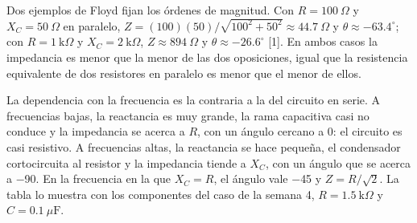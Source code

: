 \documentclass[11pt,letterpaper]{article}
\begin{document}
Dos ejemplos de Floyd fijan los órdenes de magnitud. Con $R = 100\ \Omega$ y $X_C = 50\ \Omega$ en paralelo, $Z = (100)(50)/\sqrt{100^2 + 50^2} \approx 44.7\ \Omega$ y $\theta \approx -63.4^\circ$; con $R = 1\ \text{k}\Omega$ y $X_C = 2\ \text{k}\Omega$, $Z \approx 894\ \Omega$ y $\theta \approx -26.6^\circ$ [1]. En ambos casos la impedancia es menor que la menor de las dos oposiciones, igual que la resistencia equivalente de dos resistores en paralelo es menor que el menor de ellos.

La dependencia con la frecuencia es la contraria a la del circuito en serie. A frecuencias bajas, la reactancia es muy grande, la rama capacitiva casi no conduce y la impedancia se acerca a $R$, con un ángulo cercano a 0\textdegree{}: el circuito es casi resistivo. A frecuencias altas, la reactancia se hace pequeña, el condensador \guillemotleft{}cortocircuita\guillemotright{} al resistor y la impedancia tiende a $X_C$, con un ángulo que se acerca a \ensuremath{-}90\textdegree{}. En la frecuencia en la que $X_C = R$, el ángulo vale \ensuremath{-}45\textdegree{} y $Z = R/\sqrt{2}$. La tabla lo muestra con los componentes del caso de la semana 4, $R = 1.5\ \text{k}\Omega$ y $C = 0.1\ \mu\text{F}$.
\end{document}
